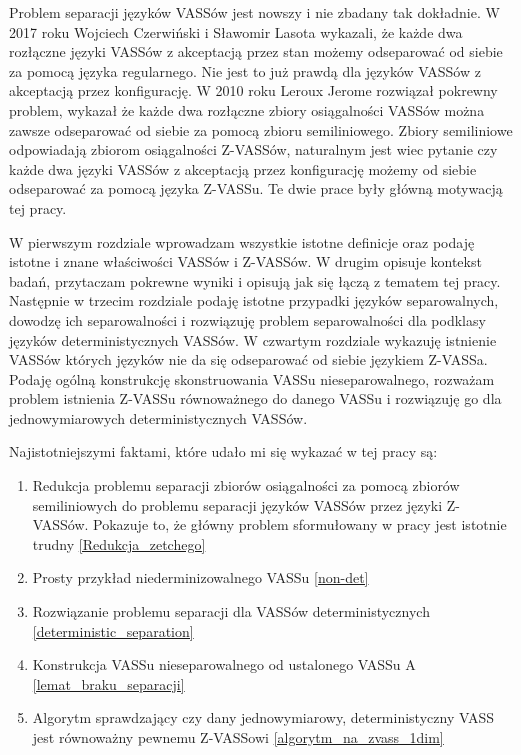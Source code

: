 \documentclass[magisterska]{pracamgr}
\begin{document}
    Problem separacji języków VASSów jest nowszy i nie zbadany tak dokładnie.
    W 2017 roku Wojciech Czerwiński i Sławomir Lasota wykazali\cite{sep1}, że każde dwa rozłączne języki VASSów z akceptacją przez stan możemy odseparować
    od siebie za pomocą języka regularnego.
    Nie jest to już prawdą dla języków VASSów z akceptacją przez konfigurację.
    W 2010 roku Leroux Jerome\cite{reach_sep_jerome} rozwiązał pokrewny problem, wykazał że każde dwa rozłączne zbiory osiągalności VASSów można zawsze odseparować
    od siebie za pomocą zbioru semiliniowego.
    Zbiory semiliniowe odpowiadają zbiorom osiągalności Z-VASSów, naturalnym jest wiec pytanie czy każde dwa języki VASSów
    z akceptacją przez konfigurację możemy od siebie odseparować za pomocą języka Z-VASSu.
    Te dwie prace były główną motywacją tej pracy.

    W pierwszym rozdziale wprowadzam wszystkie istotne definicje oraz podaję istotne i znane właściwości VASSów i Z-VASSów.
    W drugim opisuje kontekst badań, przytaczam pokrewne wyniki i opisują jak się łączą z tematem tej pracy.
    Następnie w trzecim rozdziale podaję istotne przypadki języków separowalnych, dowodzę ich separowalności i rozwiązuję problem
    separowalności dla podklasy języków deterministycznych VASSów.
    W czwartym rozdziale wykazuję istnienie VASSów których języków nie da się odseparować od siebie językiem Z-VASSa.
    Podaję ogólną konstrukcję skonstruowania VASSu nieseparowalnego, rozważam problem istnienia Z-VASSu równoważnego do danego VASSu i rozwiązuję go
    dla jednowymiarowych deterministycznych VASSów.


    Najistotniejszymi faktami, które udało mi się wykazać w tej pracy są:
    \begin{enumerate}
        \item Redukcja problemu separacji zbiorów osiągalności za pomocą zbiorów semiliniowych do problemu separacji języków VASSów przez języki Z-VASSów.
        Pokazuje to, że główny problem sformułowany w pracy jest istotnie trudny \ref{Redukcja_zetchego}
        \item Prosty przykład niederminizowalnego VASSu \ref{non-det}
        \item Rozwiązanie problemu separacji dla VASSów deterministycznych \ref{deterministic_separation}
        \item Konstrukcja VASSu nieseparowalnego od ustalonego VASSu A \ref{lemat_braku_separacji}
        \item Algorytm sprawdzający czy dany jednowymiarowy, deterministyczny VASS jest równoważny pewnemu Z-VASSowi \ref{algorytm_na_zvass_1dim}
    \end{enumerate}
\end{document}
